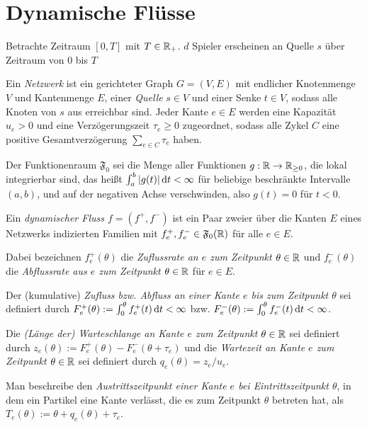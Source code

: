 \section{Dynamische Flüsse}

Betrachte Zeitraum $[0,T]$ mit $T\in\mathbb{R}_+$.
$d$ Spieler erscheinen an Quelle $s$ über Zeitraum von $0$ bis $T$

\begin{definition}[Netzwerk]
	Ein \emph{Netzwerk} ist ein gerichteter Graph $G=(V,E)$ mit endlicher Knotenmenge $V$ und Kantenmenge $E$, einer \emph{Quelle} $s\in V$ und einer Senke $t\in V$, sodass alle Knoten von $s$ aus erreichbar sind.
	Jeder Kante $e\in E$ werden eine Kapazität $u_e > 0$ und eine Verzögerungszeit $\tau_e\geq 0$ zugeordnet, sodass alle Zykel $C$ eine positive Gesamtverzögerung $\sum_{e\in C}\tau_e$ haben.
\end{definition}


\begin{definition}
	Der Funktionenraum $\mathfrak{F}_0$ sei die Menge aller Funktionen $g: \mathbb{R} \to \mathbb{R}_{\geq 0}$, die lokal integrierbar sind, das heißt $\int_a^b |g(t)| \mathop{}\!\mathrm{d} t< \infty$ für beliebige beschränkte Intervalle $(a,b)$, und auf der negativen Achse verschwinden, also $g(t)=0$ für $t<0$.
\end{definition}

\begin{definition}
	Ein \emph{dynamischer Fluss $f=(f^+, f^-)$} ist ein Paar zweier über die Kanten $E$ eines Netzwerks indizierten Familien mit $f^+_e,f^-_e\in\mathfrak F_0(\mathbb{R})$ für alle $e\in E$.
	
	Dabei bezeichnen $f_e^+(\theta)$ die \emph{Zuflussrate an $e$ zum Zeitpunkt $\theta\in\mathbb{R}$} und $f_e^-(\theta)$ die \emph{Abflussrate aus $e$ zum Zeitpunkt $\theta\in\mathbb{R}$} für $e\in E$.
	
	Der (kumulative) \emph{Zufluss bzw. Abfluss an einer Kante $e$ bis zum Zeitpunkt $\theta$} sei definiert durch $F^+_e(\theta):=\int_0^\theta f^+_e(t) \mathop{}\!\mathrm{d} t<\infty$ bzw. $F^-_e(\theta):=\int_0^\theta f^-_e(t) \mathop{}\!\mathrm{d} t<\infty$.
	
	Die \emph{(Länge der) Warteschlange an Kante $e$ zum Zeitpunkt $\theta\in\mathbb{R}$} sei definiert durch $z_e(\theta):= F_e^+(\theta) - F_e^-(\theta + \tau_e)$ und die \emph{Wartezeit an Kante $e$ zum Zeitpunkt $\theta\in\mathbb{R}$} sei definiert durch $q_e(\theta) = z_e / u_e$.
	
	Man beschreibe den \emph{Austrittszeitpunkt einer Kante $e$ bei Eintrittszeitpunkt $\theta$}, in dem ein Partikel eine Kante verlässt, die es zum Zeitpunkt $\theta$ betreten hat, als $T_e(\theta):=\theta + q_e(\theta) + \tau_e$.
\end{definition}

